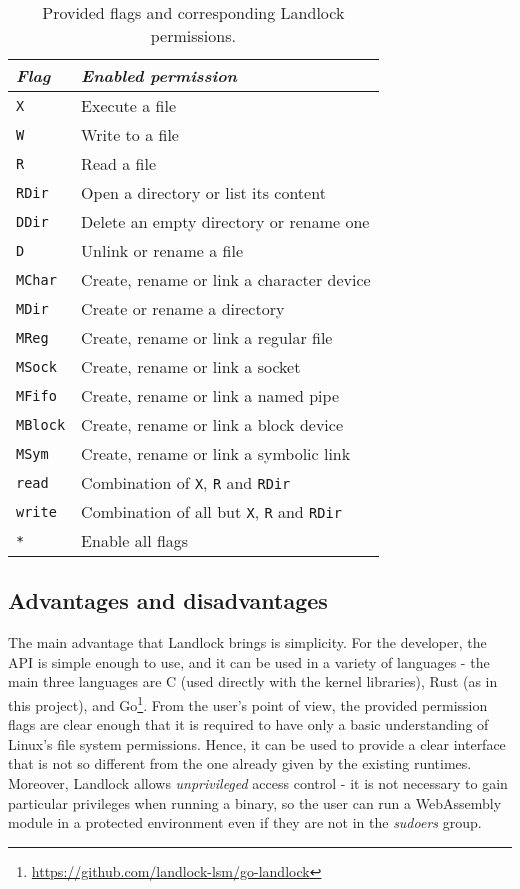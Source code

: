 \begin{table}[hbt]
  \centering
  \begin{tabular}{|l|l|}
    \hline
    \textit{Flag} & \textit{Enabled permission} \\ \hline\hline
    \texttt{X} & Execute a file \\ \hline
    \texttt{W} & Write to a file \\ \hline
    \texttt{R} & Read a file \\ \hline
    \texttt{RDir} & Open a directory or list its content \\ \hline
    \texttt{DDir} & Delete an empty directory or rename one \\ \hline
    \texttt{D} & Unlink or rename a file \\ \hline
    \texttt{MChar} & Create, rename or link a character device \\ \hline
    \texttt{MDir} & Create or rename a directory \\ \hline
    \texttt{MReg} & Create, rename or link a regular file \\ \hline
    \texttt{MSock} & Create, rename or link a socket \\ \hline
    \texttt{MFifo} & Create, rename or link a named pipe \\ \hline
    \texttt{MBlock} & Create, rename or link a block device \\ \hline
    \texttt{MSym} & Create, rename or link a symbolic link \\ \hline
    \texttt{read} & Combination of \texttt{X}, \texttt{R} and \texttt{RDir} \\ \hline
    \texttt{write} & Combination of all but \texttt{X}, \texttt{R} and \texttt{RDir} \\ \hline
    \texttt{*} & Enable all flags \\ \hline
  \end{tabular}
  \caption{Provided flags and corresponding Landlock permissions.}
  \label{table:landlock-flags}
\end{table}

\clearpage
\subsection{Advantages and disadvantages}

The main advantage that Landlock brings is simplicity. For the developer, the API is simple enough to use,
and it can be used in a variety of languages - the main three languages are C (used directly with the kernel libraries),
Rust (as in this project), and Go\footnote{\url{https://github.com/landlock-lsm/go-landlock}}.
From the user's point of view, the provided permission flags are clear enough that it is required to have
only a basic understanding of Linux's file system permissions.
Hence, it can be used to provide a clear interface that is not so different from the one already given by
the existing runtimes.
Moreover, Landlock allows \textit{unprivileged} access control - it is not necessary to gain particular privileges
when running a binary, so the user can run a WebAssembly module in a protected environment even if they are not
in the \textit{sudoers} group.

